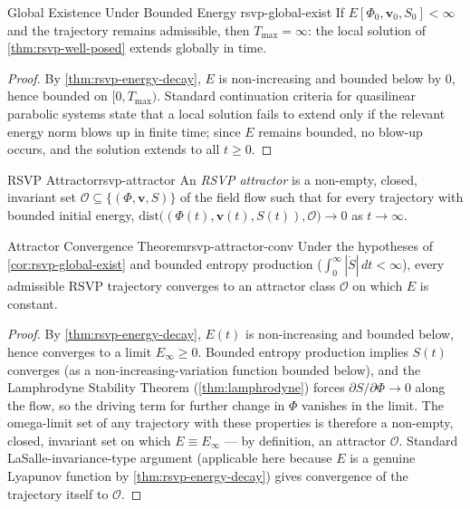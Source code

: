 \documentclass[12pt,twoside,openright]{book}
\begin{document}
\begin{corollary}{Global Existence Under Bounded Energy}%
  {rsvp-global-exist}
  If $E[\Phi_0,\mathbf{v}_0,S_0] < \infty$ and the
  trajectory remains admissible, then $T_{\max} = \infty$:
  the local solution of \cref{thm:rsvp-well-posed} extends
  globally in time.
\end{corollary}

\begin{proof}
  By \cref{thm:rsvp-energy-decay}, $E$ is non-increasing and
  bounded below by $0$, hence bounded on
  $[0,T_{\max})$. Standard continuation criteria for
  quasilinear parabolic systems state that a local solution
  fails to extend only if the relevant energy norm blows up
  in finite time; since $E$ remains bounded, no blow-up
  occurs, and the solution extends to all $t \ge 0$.
\end{proof}

\begin{definition}{RSVP Attractor}{rsvp-attractor}
  An \emph{RSVP attractor} is a non-empty, closed, invariant
  set $\mathcal{O}\subseteq\{(\Phi,\mathbf{v},S)\}$ of the
  field flow such that for every trajectory with bounded
  initial energy, $\mathrm{dist}\bigl((\Phi(t),\mathbf{v}(t),S(t)),\mathcal{O}\bigr)\to0$
  as $t\to\infty$.
\end{definition}

\begin{theorem}{Attractor Convergence Theorem}{rsvp-attractor-conv}
  Under the hypotheses of \cref{cor:rsvp-global-exist} and
  bounded entropy production
  ($\int_0^\infty |\dot S|\,dt < \infty$), every admissible
  RSVP trajectory converges to an attractor class
  $\mathcal{O}$ on which $E$ is constant.
\end{theorem}

\begin{proof}
  By \cref{thm:rsvp-energy-decay}, $E(t)$ is non-increasing
  and bounded below, hence converges to a limit
  $E_\infty \ge 0$. Bounded entropy production implies $S(t)$
  converges (as a non-increasing-variation function bounded
  below), and the Lamphrodyne Stability Theorem
  (\cref{thm:lamphrodyne}) forces
  $\partial S/\partial\Phi \to 0$ along the flow, so the
  driving term for further change in $\Phi$ vanishes in the
  limit. The omega-limit set of any trajectory with these
  properties is therefore a non-empty, closed, invariant set
  on which $E \equiv E_\infty$ --- by definition, an
  attractor $\mathcal{O}$. Standard LaSalle-invariance-type
  argument (applicable here because $E$ is a genuine
  Lyapunov function by \cref{thm:rsvp-energy-decay}) gives
  convergence of the trajectory itself to $\mathcal{O}$.
\end{proof}
\end{document}
